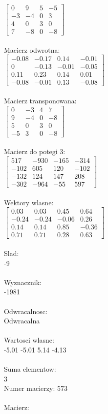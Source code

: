 \documentclass[a4paper,12pt]{article}
\begin{document}
$\begin{bmatrix} 0&9&5&-5\\-3&-4&0&3\\4&0&3&0\\7&-8&0&-8 \end{bmatrix}$
\\
\\
Macierz odwrotna:\\

$\begin{bmatrix} -0.08&-0.17&0.14&-0.01\\0&-0.13&-0.01&-0.05\\0.11&0.23&0.14&0.01\\-0.08&-0.01&0.13&-0.08 \end{bmatrix}$
\\
\\
Macierz transponowana:\\

$\begin{bmatrix} 0&-3&4&7\\9&-4&0&-8\\5&0&3&0\\-5&3&0&-8 \end{bmatrix}$
\\
\\
Macierz do potegi 3:\\

$\begin{bmatrix} 517&-930&-165&-314\\-102&605&120&-102\\-132&124&147&208\\-302&-964&-55&597 \end{bmatrix}$
\\
\\
Wektory wlasne:\\

$\begin{bmatrix} 0.03&0.03&0.45&0.64\\-0.24&-0.24&-0.06&0.26\\0.14&0.14&0.85&-0.36\\0.71&0.71&0.28&0.63 \end{bmatrix}$
\\
\\
Slad:\\
-9
\\
\\
Wyznacznik:\\
-1981
\\
\\
Odwracalnosc:\\
Odwracalna
\\
\\
Wartosci wlasne:\\
-5.01 -5.01 5.14 -4.13
\\
\\
Suma elementow:\\
3
\\
\newpage
Numer macierzy:
573
\\
\\
Macierz:\\
\end{document}
